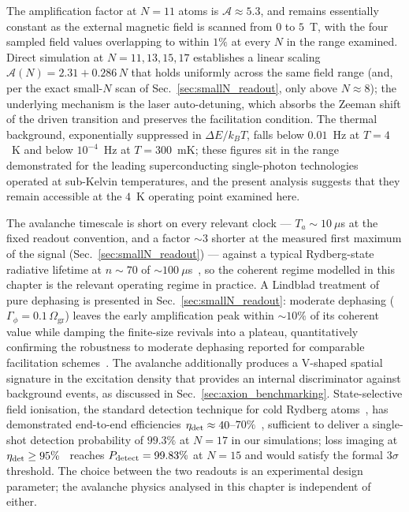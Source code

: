 The amplification factor at $N=11$ atoms is $\mathcal{A} \approx 5.3$, and remains essentially constant as the external magnetic field is scanned from $0$ to $5$~T, with the four sampled field values overlapping to within $1\%$ at every $N$ in the range examined. Direct simulation at $N = 11, 13, 15, 17$ establishes a linear scaling $\mathcal{A}(N) = 2.31 + 0.286\,N$ that holds uniformly across the same field range (and, per the exact small-$N$ scan of Sec.~\ref{sec:smallN_readout}, only above $N \approx 8$); the underlying mechanism is the laser auto-detuning, which absorbs the Zeeman shift of the driven transition and preserves the facilitation condition. The thermal background, exponentially suppressed in $\Delta E/k_BT$, falls below $0.01$~Hz at $T = 4$~K and below $10^{-4}$~Hz at $T = 300$~mK; these figures sit in the range demonstrated for the leading superconducting single-photon technologies operated at sub-Kelvin temperatures, and the present analysis suggests that they remain accessible at the $4$~K operating point examined here.

The avalanche timescale is short on every relevant clock --- $T_a \sim 10~\mu$s at the fixed readout convention, and a factor $\sim 3$ shorter at the measured first maximum of the signal (Sec.~\ref{sec:smallN_readout}) --- against a typical Rydberg-state radiative lifetime at $n\sim 70$ of $\sim 100~\mu$s~\cite{Beterov2009}, so the coherent regime modelled in this chapter is the relevant operating regime in practice. A Lindblad treatment of pure dephasing is presented in Sec.~\ref{sec:smallN_readout}: moderate dephasing ($\Gamma_\phi = 0.1\,\Omega_{\mathrm{gr}}$) leaves the early amplification peak within $\sim 10\%$ of its coherent value while damping the finite-size revivals into a plateau, quantitatively confirming the robustness to moderate dephasing reported for comparable facilitation schemes~\cite{Festa2022}. The avalanche additionally produces a V-shaped spatial signature in the excitation density that provides an internal discriminator against background events, as discussed in Sec.~\ref{sec:axion_benchmarking}. State-selective field ionisation, the standard detection technique for cold Rydberg atoms~\cite{Gallagher2005, Saffman2016}, has demonstrated end-to-end efficiencies $\eta_{\rm det} \approx 40$--$70\%$~\cite{Ryabtsev2007, Andersen2013}, sufficient to deliver a single-shot detection probability of $99.3\%$ at $N=17$ in our simulations; loss imaging at $\eta_{\rm det} \geq 95\%$~\cite{Tao2024, Manetsch2025} reaches $P_{\rm detect} = 99.83\%$ at $N=15$ and would satisfy the formal $3\sigma$ threshold. The choice between the two readouts is an experimental design parameter; the avalanche physics analysed in this chapter is independent of either.

